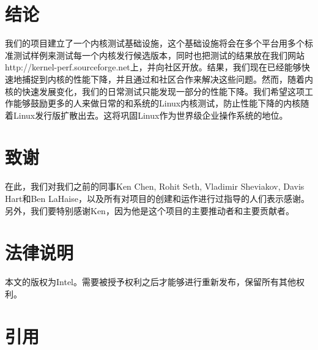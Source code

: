 \documentclass[CJK,12pt,a4paper]{article}
\begin{document}
\section{结论}
我们的项目建立了一个内核测试基础设施，这个基础设施将会在多个平台用多个标准测试样例来测试每一个内核发行候选版本，同时也把测试的结果放在我们网站http://kernel-perf.sourceforge.net上，并向社区开放。结果，我们现在已经能够快速地捕捉到内核的性能下降，并且通过和社区合作来解决这些问题。然而，随着内核的快速发展变化，我们的日常测试只能发现一部分的性能下降。我们希望这项工作能够鼓励更多的人来做日常的和系统的Linux内核测试，防止性能下降的内核随着Linux发行版扩散出去。这将巩固Linux作为世界级企业操作系统的地位。
\section*{致谢}
在此，我们对我们之前的同事Ken Chen, Rohit Seth, Vladimir Sheviakov, Davis Hart和Ben LaHaise，以及所有对项目的创建和运作进行过指导的人们表示感谢。另外，我们要特别感谢Ken，因为他是这个项目的主要推动者和主要贡献者。
\section*{法律说明}
本文的版权为Intel。需要被授予权利之后才能够进行重新发布，保留所有其他权利。
\section*{引用}
\end{document}
